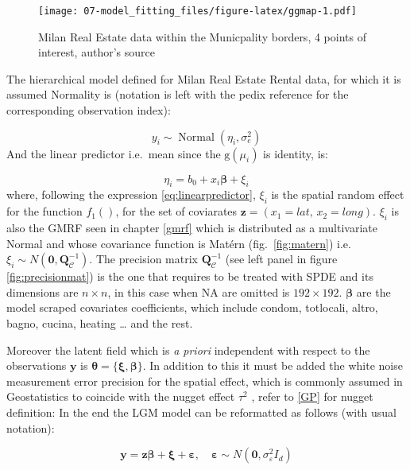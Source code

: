 \documentclass[
  12pt,
  a4paper,
  oneside]{book}
\theoremstyle{definition}
\theoremstyle{definition}
\theoremstyle{definition}
\theoremstyle{remark}
\begin{document}
\begin{figure}
\centering
\texttt{[image: 07-model\_fitting\_files/figure-latex/ggmap-1.pdf]}
\caption{\label{fig:ggmap}Milan Real Estate data within the Municpality borders, 4 points of interest, author's source}
\end{figure}

The hierarchical model defined for Milan Real Estate Rental data, for which it is assumed Normality is (notation is left with the pedix reference for the corresponding observation index):

\[
{y}_{i} \sim \operatorname{Normal}\left(\eta_{i}, \sigma_{e}^{2}\right)
\]
And the linear predictor i.e.~mean since the \(\mathrm{g}\left(\mu_{i}\right)\) is identity, is:

\[
\eta_{i}=b_{0}+x_{i} \boldsymbol\beta+\xi_{i} 
\]
where, following the expression \eqref{eq:linearpredictor}, \(\xi_i\) is the spatial random effect for the function \(f_1()\), for the set of coviarates \(\boldsymbol{z}=\left(x_{1} = lat,\, x_{2} = long\right)\). \(\xi_{i}\) is also the GMRF seen in chapter \ref{gmrf} which is distributed as a multivariate Normal and whose covariance function is Matérn (fig.~\ref{fig:matern}) i.e.~\(\xi_{i} \sim N\left(\mathbf{0}, \mathbf{Q}_{\mathscr{C}}^{-1}\right)\). The precision matrix \(\mathbf{Q}_{\mathscr{C}}^{-1}\) (see left panel in figure \ref{fig:precisionmat}) is the one that requires to be treated with SPDE and its dimensions are \(n \times n\), in this case when NA are omitted is \(192 \times 192\).
\(\boldsymbol\beta\) are the model scraped covariates coefficients, which include condom, totlocali, altro, bagno, cucina, heating \ldots{} and the rest.

Moreover the latent field which is \emph{a priori} independent with respect to the observations \(\boldsymbol{\mathbf{y}}\) is \(\boldsymbol{\theta}=\{\boldsymbol{\xi}, \boldsymbol{\beta}\}\). In addition to this it must be added the white noise measurement error precision for the spatial effect, which is commonly assumed in Geostatistics to coincide with the nugget effect \(\tau^2\) \citep{Cressie_2015}, refer to \ref{GP} for nugget definition:
In the end the LGM model can be reformatted as follows (with usual notation):

\[
\boldsymbol{\mathbf{y}}=\boldsymbol{z} \boldsymbol{\beta}+\boldsymbol{\xi}+\boldsymbol{\varepsilon}, \quad \boldsymbol{\varepsilon} \sim N\left(\mathbf{0},  \sigma^2_{\varepsilon} I_{d}\right)
\]
\end{document}
